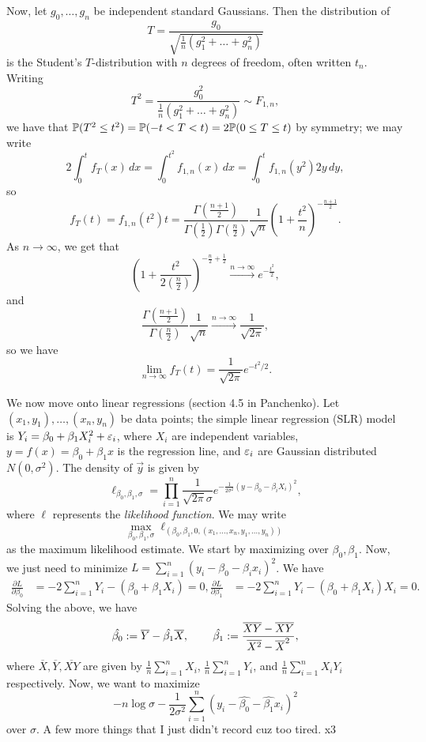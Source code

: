 Now, let $g_0, \dots, g_n$ be independent standard Gaussians. Then the distribution of
\[ T = \frac{g_0}{\sqrt{\frac{1}{n} (g_1^2 + \dots + g_n^2) }} \]
is the Student's $T$-distribution with $n$ degrees of freedom, often written $t_n$. Writing
\[ T^2 = \frac{g_0^2}{\frac{1}{n}(g_1^2 + \dots + g_n^2)} \sim F_{1, n}, \]
we have that $\mathbb P(T^2 \leq t^2) = \mathbb P(-t < T < t) = 2 \mathbb P(0 \leq T \leq t)$ by symmetry; we may write
\[ 2 \int_0^t f_T(x) \, dx = \int_0^{t^2} f_{1, n}(x) \, dx = \int_0^t f_{1, n} (y^2) 2y \, dy, \]
so
\[ f_T(t) = f_{1, n}(t^2) t = \frac{\Gamma(\frac{n+1}{2})}{\Gamma(\frac{1}{2}) \Gamma(\frac{n}{2})} \frac{1}{\sqrt{n}} \left(1 + \frac{t^2}{n}\right)^{- \frac{n + 1}{2}}. \]
As $n \to \infty$, we get that
\[ \left(1 + \frac{t^2}{2 \left(\frac{n}{2}\right)}\right)^{-\frac{n}{2} + \frac{1}{2}} \xrightarrow[]{n \to \infty} e^{-\frac{t^2}{2}}, \]
and
\[ \frac{\Gamma(\frac{n+1}{2})}{\Gamma(\frac{n}{2})} \frac{1}{\sqrt{n}} \xrightarrow[]{n \to \infty} \frac{1}{\sqrt{2 \pi}}, \]
so we have
\[ \lim_{n \to \infty} f_T(t) = \frac{1}{\sqrt{2\pi}} e^{-t^2 / 2}. \]

\newpage
\noindent We now move onto linear regressions (section 4.5 in Panchenko). Let $(x_1, y_1), \dots, (x_n, y_n)$ be data points; the simple linear regression (SLR) model is $Y_i = \beta_0 + \beta_1 X_i^2 + \varepsilon_i$, where $X_i$ are independent variables, $y = f(x) = \beta_0 + \beta_1 x$ is the regression line, and $\varepsilon_i$ are Gaussian distributed $N(0, \sigma^2)$. The density of $\vec{y}$ is given by
\[ \ell_{\beta_0, \beta_1, \sigma} = \prod_{i=1}^n \frac{1}{\sqrt{2\pi} \sigma} e^{-\frac{1}{2 \sigma^2} (y - \beta_0 - \beta_i X_i)^2}, \]
where $\ell$ represents the \textit{likelihood function}. We may write
\[ \max_{\beta_0, \beta_1, \sigma} \ell_{(\beta_0, \beta_1, 0, (x_1, \dots, x_n, y_1, \dots, y_n))} \]
as the maximum likelihood estimate. We start by maximizing over $\beta_0, \beta_1$. Now, we just need to minimize $L = \sum_{i=1}^n (y_i - \beta_0 - \beta_i x_i)^2$. We have
\begin{align*}
    \frac{\partial L}{\partial \beta_0} &= -2 \sum_{i=1}^n Y_i - (\beta_0 + \beta_1 X_i) = 0,
    \frac{\partial L}{\partial \beta_1} &= -2 \sum_{i=1}^n Y_i - (\beta_0 + \beta_1 X_i) X_i = 0.
\end{align*}
Solving the above, we have
\[ \hat{\beta_0} := \overline{Y} - \hat{\beta_1} \overline{X}, \hspace{0.3in} \hat{\beta_1} := \frac{\overline{XY} - \overline{X} \overline{Y}}{\overline{X^2} - \overline{X}^2}, \]
where $\overline{X}, \overline{Y}, \overline{XY}$ are given by $\frac{1}{n} \sum_{i=1}^n X_i$, $\frac{1}{n} \sum_{i=1}^n Y_i$, and $\frac{1}{n} \sum_{i=1}^n X_i Y_i$ respectively. Now, we want to maximize
\[ - n \log \sigma - \frac{1}{2 \sigma^2} \sum_{i=1}^n (y_i - \hat{\beta_0} - \hat{\beta_1} x_i)^2 \]
over $\sigma$. A few more things that I just didn't record cuz too tired. x3